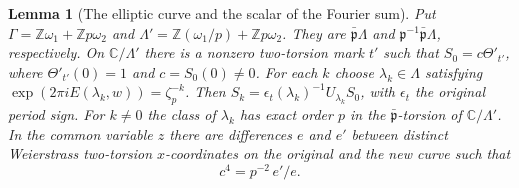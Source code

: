 \documentclass[a4paper,11pt]{article}
\newtheorem{lemma}[proposition]{Lemma}
\theoremstyle{definition}
\theoremstyle{remark}
\numberwithin{equation}{section}
\begin{document}
\begin{lemma}[The elliptic curve and the scalar of the Fourier sum]\leavevmode
\label{lem:cyclicneighbor495}
Put \(\Gamma=\mathbb Z\omega_1+\mathbb Z p\omega_2\) and
\(\Lambda'=\mathbb Z(\omega_1/p)+\mathbb Z p\omega_2\).
They are \(\bar{\mathfrak p}\Lambda\) and
\(\mathfrak p^{-1}\bar{\mathfrak p}\Lambda\), respectively.
On \(\mathbb C/\Lambda'\) there is a nonzero two-torsion mark
\(t'\) such that \(S_0=c\Theta'_{t'}\), where
\(\Theta'_{t'}(0)=1\) and \(c=S_0(0)\ne0\).
For each \(k\) choose \(\lambda_k\in\Lambda\) satisfying
\(\exp(2\pi iE(\lambda_k,w))=\zeta_p^{-k}\).
Then \(S_k=\epsilon_t(\lambda_k)^{-1}U_{\lambda_k}S_0\), with
\(\epsilon_t\) the original period sign. For \(k\ne0\) the
class of \(\lambda_k\) has exact order \(p\) in the
\(\bar{\mathfrak p}\)-torsion of \(\mathbb C/\Lambda'\).
In the common variable \(z\) there are differences \(e\) and
\(e'\) between distinct Weierstrass two-torsion \(x\)-coordinates
on the original and the new curve such that
\[
                          c^4=p^{-2}\,e'/e .
\]
\end{lemma}
\end{document}
